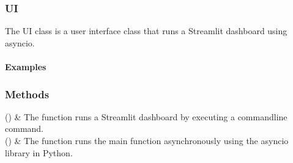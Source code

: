 \documentclass[letterpaper,10pt,english,openany,oneside]{sphinxmanual}
\begin{document}
\sphinxstepscope


\subsubsection{UI}
\label{\detokenize{api_reference/generated/QuadratiK.ui.UI:ui}}\label{\detokenize{api_reference/generated/QuadratiK.ui.UI::doc}}

\begin{fulllineitems}
\label{\detokenize{api_reference/generated/QuadratiK.ui.UI:QuadratiK.ui.UI}}
\pysigstartsignatures
{}
\pysigstopsignatures
\sphinxAtStartPar
The UI class is a user interface class that runs a Streamlit dashboard using asyncio.


\paragraph{Examples}
\label{\detokenize{api_reference/generated/QuadratiK.ui.UI:examples}}
\begin{sphinxVerbatim}[commandchars=\\\{\}]
   
\end{sphinxVerbatim}

\end{fulllineitems}

\subsubsection*{Methods}


\begin{savenotes}\sphinxattablestart
\sphinxthistablewithglobalstyle
\sphinxthistablewithnovlinesstyle
\centering
\begin{tabulary}{\linewidth}[t]{}
\sphinxtoprule
\sphinxtableatstartofbodyhook
\sphinxAtStartPar
{\hyperref[\detokenize{api_reference/generated/QuadratiK.ui.UI:QuadratiK.ui.UI.main}]{}}()
&
\sphinxAtStartPar
The  function runs a Streamlit dashboard by executing a command\sphinxhyphen{}line command.
\\
\sphinxhline
\sphinxAtStartPar
{\hyperref[\detokenize{api_reference/generated/QuadratiK.ui.UI:QuadratiK.ui.UI.run}]{}}()
&
\sphinxAtStartPar
The function runs the main function asynchronously using the asyncio library in Python.
\\
\sphinxbottomrule
\end{tabulary}
\sphinxtableafterendhook\par
\sphinxattableend\end{savenotes}
\end{document}
